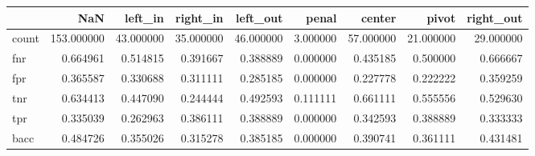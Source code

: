 \begin{tabular}{lrrrrrrrr}
\toprule
{} &         NaN &    left\_in &   right\_in &   left\_out &     penal &     center &      pivot &  right\_out \\
\midrule
count &  153.000000 &  43.000000 &  35.000000 &  46.000000 &  3.000000 &  57.000000 &  21.000000 &  29.000000 \\
fnr   &    0.664961 &   0.514815 &   0.391667 &   0.388889 &  0.000000 &   0.435185 &   0.500000 &   0.666667 \\
fpr   &    0.365587 &   0.330688 &   0.311111 &   0.285185 &  0.000000 &   0.227778 &   0.222222 &   0.359259 \\
tnr   &    0.634413 &   0.447090 &   0.244444 &   0.492593 &  0.111111 &   0.661111 &   0.555556 &   0.529630 \\
tpr   &    0.335039 &   0.262963 &   0.386111 &   0.388889 &  0.000000 &   0.342593 &   0.388889 &   0.333333 \\
bacc  &    0.484726 &   0.355026 &   0.315278 &   0.385185 &  0.000000 &   0.390741 &   0.361111 &   0.431481 \\
\bottomrule
\end{tabular}
